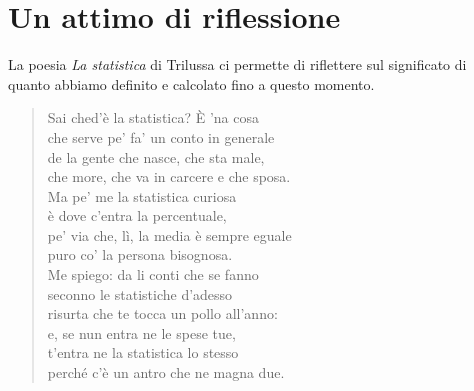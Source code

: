 \section{Un attimo di riflessione}
La poesia \emph{La statistica}
 di Trilussa ci permette di riflettere sul significato di quanto abbiamo definito e calcolato fino a questo momento.
	\begin{verse}
	Sai ched'è la statistica? È 'na cosa\\
	che serve pe' fa' un conto in generale\\
	de la gente che nasce, che sta male,\\
	che more, che va in carcere e che sposa.\\
	
	Ma pe' me la statistica curiosa\\
	è dove c'entra la percentuale,\\
	pe' via che, lì, la media è sempre eguale\\
	puro co' la persona bisognosa.\\
	
	Me spiego: da li conti che se fanno\\
	seconno le statistiche d'adesso\\
	risurta che te tocca un pollo all'anno:\\
	
	e, se nun entra ne le spese tue,\\
	t'entra ne la statistica lo stesso\\
	perché c'è un antro che ne magna due.\\
\end{verse}~\cite{2004tutte}

